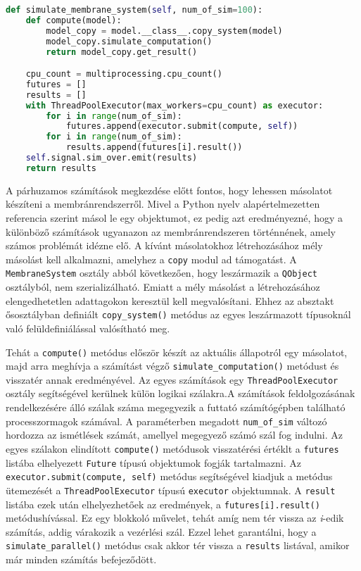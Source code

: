 \begin{lstlisting}[language={Python}]
def simulate_membrane_system(self, num_of_sim=100):
	def compute(model):
		model_copy = model.__class__.copy_system(model)
		model_copy.simulate_computation()
		return model_copy.get_result()

	cpu_count = multiprocessing.cpu_count()
	futures = []
	results = []
	with ThreadPoolExecutor(max_workers=cpu_count) as executor:
		for i in range(num_of_sim):
			futures.append(executor.submit(compute, self))
		for i in range(num_of_sim):
			results.append(futures[i].result())
	self.signal.sim_over.emit(results)
	return results
\end{lstlisting}

A párhuzamos számítások megkezdése előtt fontos, hogy lehessen másolatot készíteni a membránrendszerről. Mivel a Python nyelv alapértelmezetten referencia szerint másol le egy objektumot, ez pedig azt eredményezné, hogy a különböző számítások ugyanazon az membránrendszeren történnének, amely számos problémát idézne elő. A kívánt másolatokhoz létrehozásához mély másolást kell alkalmazni, amelyhez a \verb|copy| modul ad támogatást. A \verb|MembraneSystem| osztály abból következően, hogy leszármazik a \verb|QObject| osztályból, nem szerializálható. Emiatt a mély másolást a létrehozásához elengedhetetlen adattagokon keresztül kell megvalósítani.
Ehhez az absztakt ősosztályban definiált \verb|copy_system()| metódus az egyes leszármazott típusoknál való felüldefiniálással valósítható meg.

Tehát a \verb|compute()| metódus először készít az aktuális állapotról egy másolatot, majd arra meghívja a számítást végző \verb|simulate_computation()| metódust és visszatér annak eredményével.
Az egyes számítások egy \verb|ThreadPoolExecutor| osztály segítségével kerülnek külön logikai szálakra.A számítások feldolgozásának rendelkezésére álló szálak száma megegyezik a futtató számítógépben található processzormagok számával. A paraméterben megadott \verb|num_of_sim| változó hordozza az ismétlések számát, amellyel megegyező számó szál fog indulni. Az egyes szálakon elindított \verb|compute()| metódusok visszatérési értéklt a \verb|futures| listába elhelyezett \verb|Future| típusú objektumok fogják tartalmazni. Az \verb|executor.submit(compute, self)| metódus segítségével kiadjuk a metódus ütemezését a \verb|ThreadPoolExecutor| típusú \verb|executor| objektumnak. A \verb|result | listába ezek után elhelyezhetőek az eredmények, a \verb|futures[i].result()| metódushívással. Ez egy blokkoló művelet, tehát amíg nem tér vissza az \textit{i}-edik számítás, addig várakozik a vezérlési szál. Ezzel lehet garantálni, hogy a \verb|simulate_parallel()| metódus csak akkor tér vissza a \verb|results| listával, amikor már minden számítás befejeződött. 

